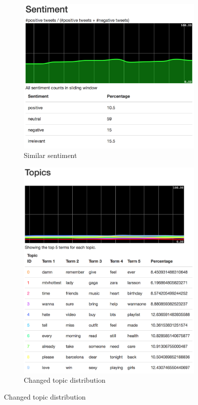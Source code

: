 \begin{figure}
    \centering
    \caption{Sample stream comparison to sample dataset}
    \label{fig:dasboard_sample}
    \begin{subfigure}[t]{0.485\textwidth}
        \centering
        \caption{Similar sentiment}
        \label{fig:sample_sentiment_distribtion_new}
        \includegraphics[width=\textwidth]{../images/dashboard_sentiment_sample.png}
    \end{subfigure}
    \begin{subfigure}[t]{0.505\textwidth}
        \centering
        \caption{Changed topic distribution}
        \label{fig:sample_topic_distribtion_new}
        \includegraphics[width=\textwidth]{../images/dashboard_topics_sample.png}

\end{subfigure}
\end{figure}
